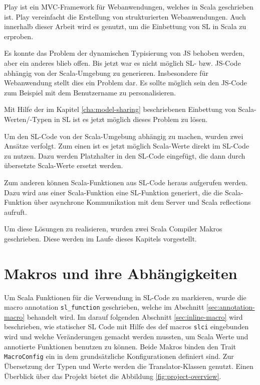 \documentclass[12pt,bibtotoc]{scrreprt}
\begin{document}
Play ist ein \ac{MVC}-Framework für Webanwendungen, welches in Scala geschrieben ist. Play vereinfacht die Erstellung von strukturierten Webanwendungen. Auch innerhalb dieser Arbeit wird es genutzt, um die Einbettung von SL in Scala zu erproben.

Es konnte das Problem der dynamischen Typisierung von JS behoben werden, aber ein anderes blieb offen. Bis jetzt war es nicht möglich SL- bzw. JS-Code abhängig von der Scala-Umgebung zu generieren. Insbesondere für Webanwendung stellt dies ein Problem dar. Es sollte möglich sein den JS-Code zum Beispiel mit dem Benutzername zu personalisieren. 

Mit Hilfe der im Kapitel \ref{cha:model-sharing} beschriebenen Einbettung von Scala-Werten/-Typen in SL ist es jetzt möglich dieses Problem zu lösen.

Um den SL-Code von der Scala-Umgebung abhängig zu machen, wurden zwei Ansätze verfolgt. Zum einen ist es jetzt möglich Scala-Werte direkt im SL-Code zu nutzen. Dazu werden Platzhalter in den SL-Code eingefügt, die dann durch übersetzte Scala-Werte ersetzt werden.

Zum anderen können Scala-Funktionen aus SL-Code heraus aufgerufen werden. Dazu wird aus einer Scala-Funktion eine SL-Funktion generiert, die die Scala-Funktion über asynchrone Kommunikation mit dem Server und Scala reflections aufruft.

Um diese Lösungen zu realisieren, wurden zwei Scala Compiler Makros geschrieben. Diese werden im Laufe dieses Kapitels vorgestellt.

\section{Makros und ihre Abhängigkeiten}
\label{sec:project-structure}

Um Scala Funktionen für die Verwendung in \ac{SL}-Code zu markieren, wurde die macro annotation \lstinline!sl_function! geschrieben, welche im Abschnitt \ref{sec:annotation-macro} behandelt wird. Im darauf folgenden Abschnitt \ref{sec:inline-macro} wird beschrieben, wie statischer \ac{SL} Code mit Hilfe des def macros \lstinline!slci! eingebunden wird und welche Veränderungen gemacht werden mussten, um Scala Werte und annotierte Funktionen benutzen zu können. Beide Makros binden den Trait \lstinline!MacroConfig! ein in dem grundsätzliche Konfigurationen definiert sind. Zur Übersetzung der Typen und Werte werden die Translator-Klassen genutzt. Einen Überblick über das Projekt bietet die Abbildung \ref{fig:project-overview}.
\end{document}
